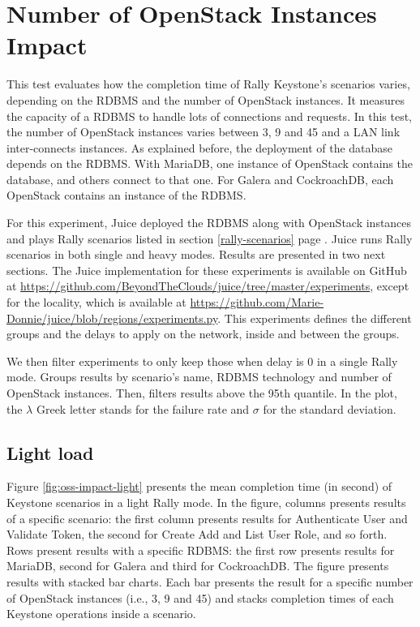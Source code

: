 \section{Number of OpenStack Instances Impact}

This test evaluates how the completion time of Rally Keystone’s scenarios varies, depending on the RDBMS and the number of OpenStack instances. It measures the capacity of a RDBMS to handle lots of connections and requests. In this test, the number of OpenStack instances varies between 3, 9 and 45 and a LAN link inter-connects instances. As explained before, the deployment of the database depends on the RDBMS. With MariaDB, one instance of OpenStack contains the database, and others connect to that one. For Galera and CockroachDB, each OpenStack contains an instance of the RDBMS.

For this experiment, Juice deployed the RDBMS along with OpenStack instances and plays Rally scenarios listed in section \ref{rally-scenarios} page \pageref{rally-scenarios}. Juice runs Rally scenarios in both single and heavy modes. Results are presented in two next sections. The Juice implementation for these experiments is available on GitHub at \url{https://github.com/BeyondTheClouds/juice/tree/master/experiments}, except for the locality, which is available at \url{https://github.com/Marie-Donnie/juice/blob/regions/experiments.py}. This experiments defines the different groups and the delays to apply on the network, inside and between the groups.

We then filter experiments to only keep those when delay is 0 in a single Rally mode. Groups results by scenario’s name, RDBMS technology and number of OpenStack instances. Then, filters results above the 95th quantile. In the plot, the $\lambda$ Greek letter stands for the failure rate and $\sigma$ for the standard deviation.

\subsection{Light load}

Figure \ref{fig:oss-impact-light} presents the mean completion time (in second) of Keystone scenarios in a light Rally mode. In the figure, columns presents results of a specific scenario: the first column presents results for Authenticate User and Validate Token, the second for Create Add and List User Role, and so forth. Rows present results with a specific RDBMS: the first row presents results for MariaDB, second for Galera and third for CockroachDB. The figure presents results with stacked bar charts. Each bar presents the result for a specific number of OpenStack instances (i.e., 3, 9 and 45) and stacks completion times of each Keystone operations inside a scenario.

